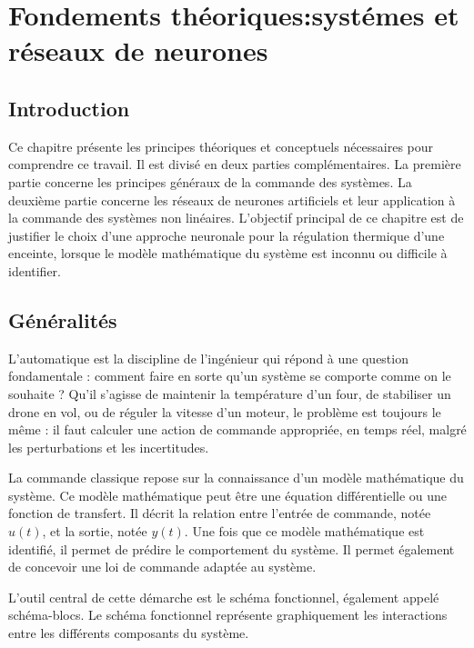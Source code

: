 \chapter{Fondements théoriques:systémes et réseaux de neurones}

\section*{Introduction}

Ce chapitre présente les principes théoriques et conceptuels nécessaires pour comprendre ce travail. Il est divisé en deux parties complémentaires. La première partie concerne les principes généraux de la commande des systèmes. La deuxième partie concerne les réseaux de neurones artificiels et leur application à la commande des systèmes non linéaires. L'objectif principal de ce chapitre est de justifier le choix d'une approche neuronale pour la régulation thermique d'une enceinte, lorsque le modèle mathématique du système est inconnu ou difficile à identifier.

\section{Généralités}

L'automatique est la discipline de l'ingénieur qui répond à une
question fondamentale : comment faire en sorte qu'un système se
comporte comme on le souhaite ? Qu'il s'agisse de maintenir la
température d'un four, de stabiliser un drone en vol, ou de réguler
la vitesse d'un moteur, le problème est toujours le même : il faut
calculer une action de commande appropriée, en temps réel, malgré
les perturbations et les incertitudes.

La commande classique repose sur la connaissance d'un modèle mathématique du système. Ce modèle mathématique peut être une équation différentielle ou une fonction de transfert. Il décrit la relation entre l'entrée de commande, notée $u(t)$, et la sortie, notée $y(t)$. Une fois que ce modèle mathématique est identifié, il permet de prédire le comportement du système. Il permet également de concevoir une loi de commande adaptée au système.

L'outil central de cette démarche est le schéma fonctionnel, également appelé schéma-blocs. Le schéma fonctionnel représente graphiquement les interactions entre les différents composants du système.

